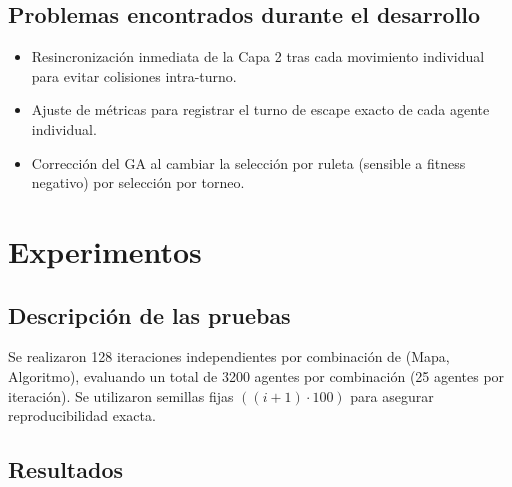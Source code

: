 \documentclass[11pt,a4paper]{article}
\begin{document}
\subsection{Problemas encontrados durante el desarrollo}
\label{sec:problemas}
\begin{itemize}
    \item Resincronización inmediata de la Capa 2 tras cada movimiento individual para evitar colisiones intra-turno.
    \item Ajuste de métricas para registrar el turno de escape exacto de cada agente individual.
    \item Corrección del GA al cambiar la selección por ruleta (sensible a fitness negativo) por selección por torneo.
\end{itemize}

\section{Experimentos}

\subsection{Descripción de las pruebas}
Se realizaron 128 iteraciones independientes por combinación de (Mapa, Algoritmo), evaluando un total de 3200 agentes por combinación (25 agentes por iteración). Se utilizaron semillas fijas $((i+1) \cdot 100)$ para asegurar reproducibilidad exacta.

\subsection{Resultados}
\end{document}
